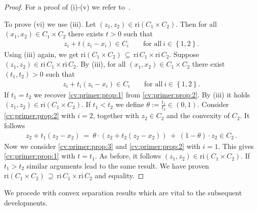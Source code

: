\begin{proof}
  For a proof of (i)-(v) we refer to~\cite[Theorem 6.2 - 6.7]{Rockafellar1970}.

To prove (vi) we use (iii).
Let
  $
  (z_1, z_2)
  \in 
  \mathrm{ri}(C_1\!\times C_2).
  $
  Then for all 
  $
  (x_1, x_2)
  \in 
  C_1\!\times C_2
  $
  there exists
  $t>0$
  such that
  \begin{gather}
    \label{cv:primer:prop:1}
      z_i + t (z_i-x_i)
      \in C_i
      \qquad
      \text{for all}\ 
      i\in \left\{ 1,2 \right\}.
  \end{gather}
  Using (iii) again, we get
  $
  \mathrm{ri}(C_1\!\times C_2)
  \, 
  \subseteq
  \,
          \mathrm{ri}\,C_1
          \! 
          \times
          \mathrm{ri}\,C_2
  $.
  Suppose 
  $
  (z_1,z_2)
    \in
    \mathrm{ri}\,C_1
    \!
    \times
    \mathrm{ri}\,C_2
  $.
  By (iii), for all
  $
    (x_1,x_2)\in C_1\times C_2
  $
  there exist
  $
    (t_1,t_2)>0
  $
  such that
  \begin{gather}
    \label{cv:primer:prop:2}
      z_i + t_i (z_i-x_i)
      \in C_i
      \qquad
      \text{for all}\ 
      i\in \left\{ 1,2 \right\}.
  \end{gather}
  If $t_1=t_2$
  we recover
  \eqref{cv:primer:prop:1}
  from
  \eqref{cv:primer:prop:2}.
  By (iii) it holds
  $
  (z_1,z_2)
    \in
    \mathrm{ri}
    (C_1
    \!
    \times
    C_2)
  $.
  If
  $t_1<t_2$
  we
  define $\theta:=\frac{t_1}{t_2}\in (0,1).$
  Consider  
  \eqref{cv:primer:prop:2} with $i=2$,
  together with $z_2 \in C_2$
  and
  the convexity of $C_2$.
  It follows
  \begin{gather}
    \label{cv:primer:prop:3}
    z_2 + t_1 (z_2 - x_2)
    \ 
    =
    \ 
    \theta
    \cdot
    (
    z_2 + t_2 (z_2 - x_2)
    )
    \ 
    +
    \ 
    (1-\theta)
    \cdot
    z_2
    \in C_2
    \,.
  \end{gather}
  Now we consider
  \eqref{cv:primer:prop:3} and
  \eqref{cv:primer:prop:2} with $i=1$.
  This gives \eqref{cv:primer:prop:1} with $t=t_1$.
  As before, it follows
  $
  (z_1,z_2)\in\mathrm{ri}(C_1\!\times C_2)
  $.
  If 
  $t_1>t_2$
  similar arguments lead to the same result.
  We have proven 
  $
  \mathrm{ri}(C_1\!\times C_2)
  \, 
  \supseteq
  \,
          \mathrm{ri}\,C_1
          \! 
          \times
          \mathrm{ri}\,C_2
  $
  and equality.
\end{proof}
 
We procede with convex separation results which are vital to the subsequent developments.

